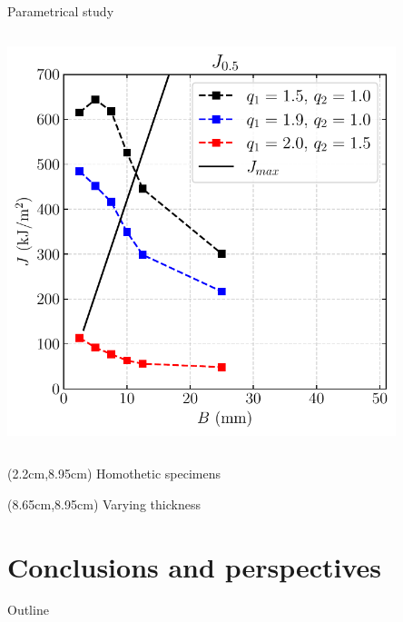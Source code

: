 \documentclass[9pt]{beamer}
\begin{document}
\begin{frame}{Parametrical study}
\begin{columns}
        \centering
        \includegraphics[width=0.85\textwidth]{Images/plot_comp_12_5_q1_q2.pdf}
    \end{columns}
    
    \begin{textblock*}{5cm}(2.2cm,8.95cm)
        \small Homothetic specimens
    \end{textblock*}

    \begin{textblock*}{5cm}(8.65cm,8.95cm)
        \small Varying thickness
    \end{textblock*}
    
\end{frame}


\section{Conclusions and perspectives}

\begin{frame}{Outline}
	\tableofcontents[ 
    currentsubsection, 
    hideothersubsections, 
    sectionstyle=show/shaded, 
    subsectionstyle=show/shaded, 
    ] 
\end{frame}

\end{document}
